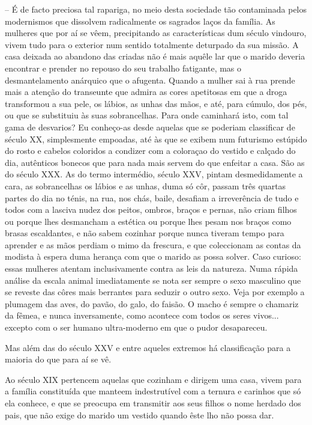 \documentclass[9pt]{article}
\begin{document}
-- É de facto preciosa tal rapariga, no meio desta sociedade tão
contaminada pelos modernismos que dissolvem radicalmente os sagrados
laços da fa\-mí\-lia. As mu\-lheres que por aí se vêem, precipitando as características dum século vindouro, vivem tudo para o exterior num sentido totalmente deturpado da sua missão. A casa deixada ao abandono das criadas
não é mais a\-quê\-le lar que o marido deveria encontrar e prender no repouso do seu traba\-lho fatigante, mas o desmantelamento anárquico que o
afugenta. Quando a mu\-lher sai à rua prende mais a aten\-ção do transeunte que admira as cores apetitosas em que a droga transformou a sua
pele, os lábios, as unhas das mãos, e até, para cúmulo, dos pés, ou que se
substituiu às suas sobrance\-lhas. Para onde caminhará isto, com tal
gama de desvarios? Eu conheço-as desde aquelas que se poderiam classifi\-car de século XX, simplesmente empoadas, até às que se exibem num
futurismo estúpido do rosto e cabelos coloridos a condizer com a coloraçao do vestido e calçado do dia, autênticos bonecos que para nada
mais servem do que enfeitar a casa. São as do século XXX. As do termo intermédio, século XXV, pintam desmedidamente a cara, as sobrance\-lhas os lábios e as unhas, duma só côr, passam três
quartas partes do dia no ténis, na rua, nos chás, baile, desafiam a irreverência de tudo e todos com a lasciva nudez dos
peitos, ombros, braços e pernas, não criam fi\-lhos ou porque lhes
desmancham a estética ou porque lhes pesam nos braços como brasas
escaldantes, e não sabem cozinhar porque nunca tiveram tempo para aprender e as mãos perdiam o mimo da frescura, e que coleccionam as contas
da modista à espera duma heran\-ça com que o marido as possa solver.
Caso curioso: essas mu\-lheres atentam inclusivamente contra as leis da natureza. Numa rápida
análise da escala animal imediatamente se nota
ser sempre o sexo masculino que se reveste das
côres mais berrantes para seduzir o outro sexo.
Veja por exemplo a plumagem das aves, do pavão,
do galo, do faisão. O macho é sempre o chamariz
da fêmea, e nunca inversamente, como acontece com
todos os seres vivos... excepto com o ser humano
ultra-moderno em que o pudor desapareceu.

Mas além das do século XXV e entre aqueles extremos há classifi\-ca\-ção para a maioria do que para aí se vê.

Ao século XIX pertencem aquelas que cozinham e dirigem uma casa,
vivem para a fa\-mí\-lia constituída que manteem indestrutível com a ternura e carinhos que só ela conhece, e que se preocupa em transmitir aos
seus fi\-lhos o nome herdado dos pais, que não exige do marido um vestido quan\-do êste lho não possa dar.
\end{document}

